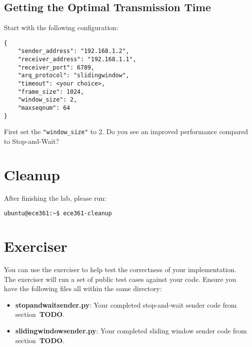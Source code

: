 \documentclass[11pt]{article}
\begin{document}


\subsection{Getting the Optimal Transmission Time}

Start with the following configuration:
\begin{lstlisting}[style=ece361-shell-base, caption={Sliding Window Configuration}]
{
    "sender_address": "192.168.1.2",
    "receiver_address": "192.168.1.1",
    "receiver_port": 6789,
    "arq_protocol": "slidingwindow",
    "timeout": <your choice>,
    "frame_size": 1024,
    "window_size": 2,
    "maxseqnum": 64
}
\end{lstlisting}

First set the \texttt{"window\_size"} to 2. Do you see an improved performance compared to Stop-and-Wait?


\section{Cleanup}
After finishing the lab, please run:
\begin{lstlisting}[style=ece361-shell-base]
ubuntu@ece361:~$ ece361-cleanup
\end{lstlisting}

\section{Exerciser}
\label{sec:exercise}
You can use the exerciser to help test the correctness of your implementation. The exerciser will run a set of public test cases against your code.
Ensure you have the following files all within the same directory:
\begin{itemize}
    \item \textbf{stopandwaitsender.py}: Your completed stop-and-wait sender code from section~\textbf{TODO}.
    \item \textbf{slidingwindowsender.py}: Your completed sliding window sender code from section~\textbf{TODO}.
\end{itemize}
\end{document}
